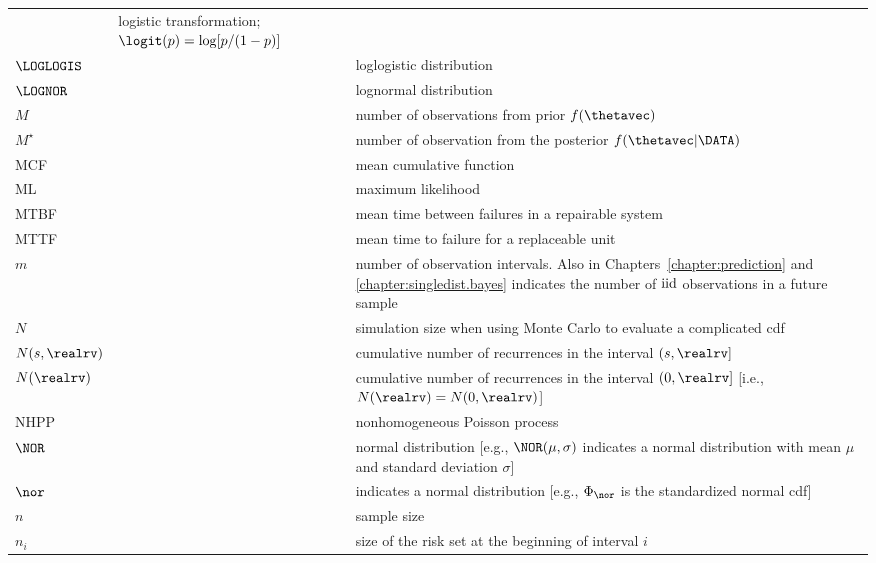 \begin{supertabular}{p{0.9in}lp{4.0in}}
&logistic transformation; $\logit(p)=\log[p/(1-p)]$
\\
$\LOGLOGIS$ &
&loglogistic distribution
   \\
$\LOGNOR$ &
&lognormal distribution
   \\
$M$ & 
&number of observations from prior $f(\thetavec)$
   \\
$M^{\star}$ & 
            &
number of observation from the posterior 
$f(\thetavec | \DATA)$
   \\
MCF & 
      &
mean cumulative function
  \\
ML & 
      &
maximum likelihood
    \\
MTBF & 
      &
mean time between failures in a repairable system
   \\
MTTF & 
      &
mean time to failure for a replaceable unit
    \\
$m$ & 
&number of observation intervals. 
Also in Chapters~\ref{chapter:prediction}
and
\ref{chapter:singledist.bayes} indicates
the number of ${\rm iid}$ observations in a future sample
\\
$N$ & 
&simulation size when using Monte Carlo to evaluate a complicated cdf
   \\
$N(s, \realrv)$ &
&cumulative number of 
recurrences in the interval $(s, \realrv]$
\\
$N(\realrv)$ &
&cumulative number of 
recurrences in the interval $(0, \realrv]$
[i.e., $N(\realrv)=N(0,\realrv)$]
 \\
NHPP        &
&nonhomogeneous Poisson process
\\
$\NOR$ &
&normal distribution
[e.g., $\NOR(\mu,\sigma)$ indicates a normal
distribution with mean $\mu$ and standard deviation
$\sigma$]
   \\
$\nor$      & 
&indicates a normal distribution 
[e.g., $\Phi_{\nor}$ is the standardized normal cdf]
  \\
$n    $     & 
            &
sample size
\\
$n_{i}$     & 
            &
size of the risk set at the
beginning of interval $i$
    \\

\end{supertabular}
